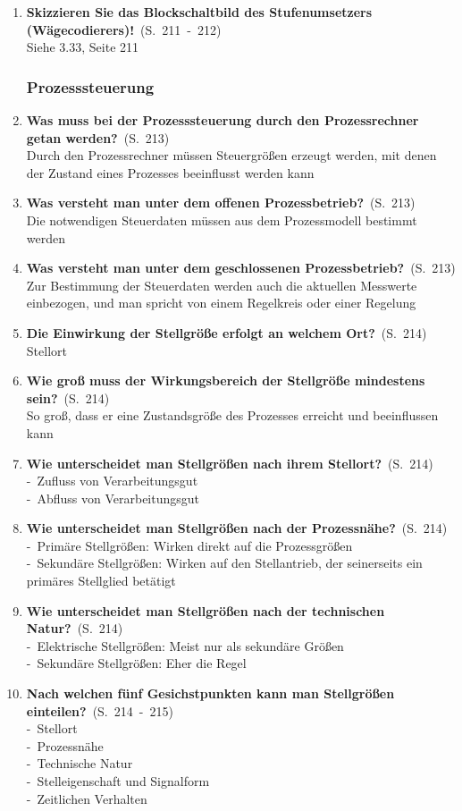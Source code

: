 \documentclass[a4paper,12pt]{article}
\newcommand{\question}[3]{\pagebreak[3]\item {\textbf{#1?}}\ (S.\ #2)#3}
\newcommand{\statement}[3]{\pagebreak[3]\item {\textbf{#1!}}\ (S.\ #2)#3}
\newcommand{\catchword}[1]{\\-\ #1}
\newcommand{\normaltext}[1]{\\#1}
\newcommand{\page}[1]{#1}
\newcommand{\pages}[2]{#1\ -\ #2}
\begin{document}
\begin{enumerate}
  \statement{Skizzieren Sie das Blockschaltbild des Stufenumsetzers (Wägecodierers)} {\pages{211}{212}}
  {
    \normaltext{Siehe \index{Bild} 3.33, Seite 211}
  }

  \subsubsection{Prozesssteuerung}

  \question{Was muss bei der Prozesssteuerung durch den Prozessrechner getan werden}{\page{213}}
  {
    \normaltext{Durch den Prozessrechner müssen Steuergrößen erzeugt werden, mit denen der Zustand
                eines Prozesses beeinflusst werden kann}
  }

  \question{Was versteht man unter dem offenen Prozessbetrieb}{\page{213}}
  {
    \normaltext{Die notwendigen Steuerdaten müssen aus dem Prozessmodell bestimmt werden}
  }

  \question{Was versteht man unter dem geschlossenen Prozessbetrieb}{\page{213}}
  {
    \normaltext{Zur Bestimmung der Steuerdaten werden auch die aktuellen Messwerte einbezogen,
                und man spricht von einem Regelkreis oder einer Regelung}
  }

  \question{Die Einwirkung der Stellgröße erfolgt an welchem Ort}{\page{214}}
  {
    \normaltext{Stellort}
  }

  \question{Wie groß muss der Wirkungsbereich der Stellgröße mindestens sein}{\page{214}}
  {
    \normaltext{So groß, dass er eine Zustandsgröße des Prozesses erreicht und
                beeinflussen kann}
  }

  \question{Wie unterscheidet man Stellgrößen nach ihrem Stellort}{\page{214}}
  {
    \catchword{Zufluss von Verarbeitungsgut}
    \catchword{Abfluss von Verarbeitungsgut}
  }

  \question{Wie unterscheidet man Stellgrößen nach der Prozessnähe}{\page{214}}
  {
    \catchword{Primäre Stellgrößen: Wirken direkt auf die Prozessgrößen}
    \catchword{Sekundäre Stellgrößen: Wirken auf den Stellantrieb, der seinerseits
               ein primäres Stellglied betätigt}
  }

  \question{Wie unterscheidet man Stellgrößen nach der technischen Natur}{\page{214}}
  {
    \catchword{Elektrische Stellgrößen: Meist nur als sekundäre Größen}
    \catchword{Sekundäre Stellgrößen: Eher die Regel}
  }

  \question{Nach welchen fünf Gesichstpunkten kann man Stellgrößen einteilen}{\pages{214}{215}}
  {
    \catchword{Stellort}
    \catchword{Prozessnähe}
    \catchword{Technische Natur}
    \catchword{Stelleigenschaft und Signalform}
    \catchword{Zeitlichen Verhalten}
  }


\end{enumerate}
\end{document}
